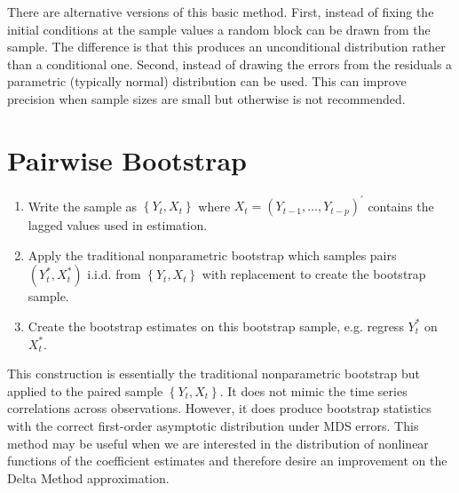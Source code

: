 \documentclass[10pt]{article}
\begin{document}
There are alternative versions of this basic method. First, instead of fixing the initial conditions at the sample values a random block can be drawn from the sample. The difference is that this produces an unconditional distribution rather than a conditional one. Second, instead of drawing the errors from the residuals a parametric (typically normal) distribution can be used. This can improve precision when sample sizes are small but otherwise is not recommended.

\section{Pairwise Bootstrap}
\begin{enumerate}
  \item Write the sample as $\left\{Y_{t}, X_{t}\right\}$ where $X_{t}=\left(Y_{t-1}, \ldots, Y_{t-p}\right)^{\prime}$ contains the lagged values used in estimation.

  \item Apply the traditional nonparametric bootstrap which samples pairs $\left(Y_{t}^{*}, X_{t}^{*}\right)$ i.i.d. from $\left\{Y_{t}, X_{t}\right\}$ with replacement to create the bootstrap sample.

  \item Create the bootstrap estimates on this bootstrap sample, e.g. regress $Y_{t}^{*}$ on $X_{t}^{*}$.

\end{enumerate}
This construction is essentially the traditional nonparametric bootstrap but applied to the paired sample $\left\{Y_{t}, X_{t}\right\}$. It does not mimic the time series correlations across observations. However, it does produce bootstrap statistics with the correct first-order asymptotic distribution under MDS errors. This method may be useful when we are interested in the distribution of nonlinear functions of the coefficient estimates and therefore desire an improvement on the Delta Method approximation.
\end{document}
